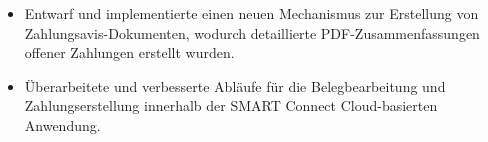 \begin{itemize}
  \item Entwarf und implementierte einen neuen Mechanismus zur Erstellung von Zahlungsavis-Dokumenten, wodurch detaillierte PDF-Zusammenfassungen offener Zahlungen erstellt wurden.
  \item Überarbeitete und verbesserte Abläufe für die Belegbearbeitung und Zahlungserstellung innerhalb der SMART Connect Cloud-basierten Anwendung.
\end{itemize}
\divider
